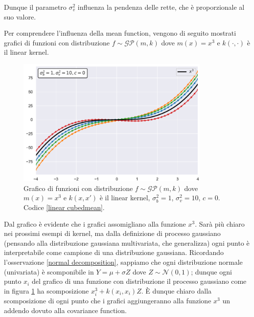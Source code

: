 Dunque il parametro $\sigma_v^2$ influenza la pendenza delle rette, che è proporzionale al suo valore.

Per comprendere l'influenza della mean function, vengono di seguito mostrati grafici di funzioni con distribuzione $f\sim \mathcal{GP}(m,k)$ dove $m(x)=x^3$ e $k(\cdot,\cdot)$ è il linear kernel.


\begin{figure}[h]
    \centering
    \includegraphics[width=0.85\textwidth]{images/Gaussian process/Linear - cubedmean.pdf}
    \caption{Grafico di funzioni con distribuzione $f\sim \mathcal{GP}(m,k)$ dove $m(x)=x^3$ e $k(x,x')$ è il linear kernel, $\sigma_b^2=1$, $\sigma_v^2=10$, $c=0$. Codice \ref{linear cubedmean}.}
    \label{10 sample linear kernel cubed mean}
\end{figure}


\newpage

Dal grafico è evidente che i grafici assomigliano alla funzione $x^3$. Sarà più chiaro nei prossimi esempi di kernel, ma dalla definizione di processo gaussiano (pensando alla distribuzione gaussiana multivariata, che generalizza) ogni punto è interpretabile come campione di una distribuzione gaussiana. Ricordando l'osservazione \ref{normal decomposition}, sappiamo che ogni distribuzione normale (univariata) è scomponibile in $Y=\mu+\sigma Z$ dove $Z\sim \mathcal{N}(0,1)$; dunque ogni punto $x_i$ del grafico di una funzione con distribuzione il processo gaussiano come in figura \ref{10 sample linear kernel cubed mean} ha scomposizione $x_i^3+k(x_i,x_i)Z$. È dunque chiaro dalla scomposizione di ogni punto che i grafici aggiungeranno alla funzione $x^3$ un addendo dovuto alla covariance function.





